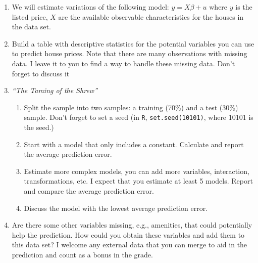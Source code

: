 \documentclass[12pt,onecolumn]{article}
\begin{document}
\begin{enumerate}
  \item We will estimate variations of the following model: $y = X\beta+u$ where $y$ is the listed price, $X$ are the available observable characteristics for the houses in the data set.
  \item Build a table with descriptive statistics for the potential variables you can use to predict house prices. Note that there are many observations with missing data. I leave it to you to find a way to handle these missing data. Don't forget to discuss it
  \item {\it ``The Taming of the Shrew''}
  \begin{enumerate}
  	\item Split the sample into two samples: a training (70\%) and a test (30\%) sample. Don't forget to set a seed (in \texttt{R}, \texttt{set.seed(10101)}, where 10101 is the seed.)
    \item Start with a model that only includes a constant. Calculate and report the average prediction error.
    \item Estimate more complex models, you can add more variables, interaction, transformations, etc. I expect that you estimate at least 5 models. Report and compare the average prediction error.
    \item Discuss the model with the lowest average prediction error.
  \end{enumerate}
  \item Are there some other variables missing, e.g., amenities, that could potentially help the prediction. How could you obtain these variables and add them to this data set? I welcome any external data that you can merge to aid in the prediction and count as a bonus in the grade. 
  

\end{enumerate}
\end{document}
